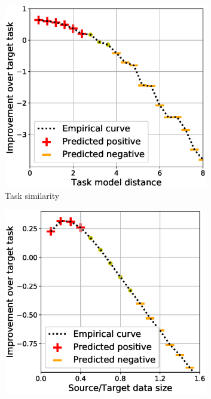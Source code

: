 \begin{figure}[!t]
	\begin{subfigure}[b]{0.32\textwidth}
		\centering
		\includegraphics[width=0.98\textwidth]{figures/model_shift_phase_transition.eps}
		\caption{Task similarity}
		\label{fig_model_shift}
	\end{subfigure}\hfill
	\begin{subfigure}[b]{0.32\textwidth}
		\centering
		\includegraphics[width=0.98\textwidth]{figures/datapoints_phase_transition.eps}

\end{subfigure}
\end{figure}

